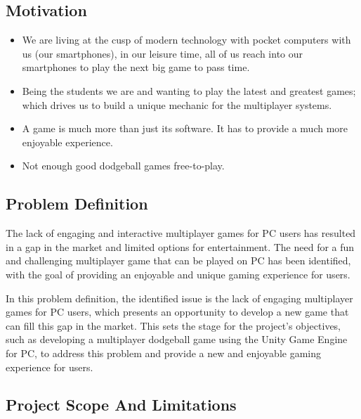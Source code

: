 \documentclass[12pt]{report}
\begin{document}
\raggedright
\subsection{ Motivation}

\justifying
\setlength{\parindent}{4em}
\setlength{\parskip}{0.5em}
\renewcommand{\baselinestretch}{1.5}
\normalsize\hspace{1.7cm}\begin{itemize} \item We are living at the cusp of modern technology with pocket computers with us (our smartphones), in our leisure time, all of us reach into our smartphones to play the next big game to pass time.

\item Being the students we are and wanting to play the latest and greatest games; which drives us to build a unique mechanic for the multiplayer systems.

\item A game is much more than just its software. It has to provide a much more enjoyable experience.

\item Not enough good dodgeball games free-to-play.\\
\end{itemize}
\raggedright
\subsection{Problem Definition}

\justifying
\setlength{\parindent}{4em}
\setlength{\parskip}{0.5em}
\renewcommand{\baselinestretch}{1.5}
\normalsize \hspace{1.7cm} The lack of engaging and interactive multiplayer games for PC users has resulted in a gap in the market and limited options for entertainment. The need for a fun and challenging multiplayer game that can be played on PC has been identified, with the goal of providing an enjoyable and unique gaming experience for users.

In this problem definition, the identified issue is the lack of engaging multiplayer games for PC users, which presents an opportunity to develop a new game that can fill this gap in the market. This sets the stage for the project's objectives, such as developing a multiplayer dodgeball game using the Unity Game Engine for PC, to address this problem and provide a new and enjoyable gaming experience for users.
\clearpage
\raggedright
\subsection{Project Scope And Limitations }
\end{document}
